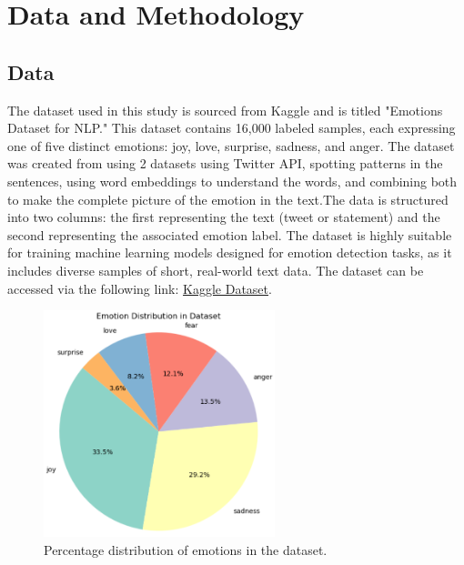 

\section{Data and Methodology}

\subsection{Data}
The dataset used in this study is sourced from Kaggle and is titled "Emotions Dataset for NLP." This dataset contains 16,000 labeled samples, each expressing one of five distinct emotions: joy, love, surprise, sadness, and anger. The dataset was created from using 2 datasets using Twitter API, spotting patterns in the sentences, using word embeddings to understand the words, and combining both to make the complete picture of the emotion in the text.The data is structured into two columns: the first representing the text (tweet or statement) and the second representing the associated emotion label. The dataset is highly suitable for training machine learning models designed for emotion detection tasks, as it includes diverse samples of short, real-world text data. The dataset can be accessed via the following link: \href{https://www.kaggle.com/datasets/praveengovi/emotions-dataset-for-nlp/data}{\color{blue}Kaggle Dataset}.

\begin{figure}[H]
    \centering
    \includegraphics[width=0.6\textwidth]{images/emotion_pie.png}
    \caption{Percentage distribution of emotions in the dataset.}
    \label{fig:emotion_pie}
\end{figure}

